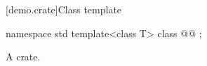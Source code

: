[demo.crate]{Class template }

\begin{codeblock}
namespace std {
  template<class T>
  class @@ {};
}
\end{codeblock}

\pnum
\remarks
A crate.

